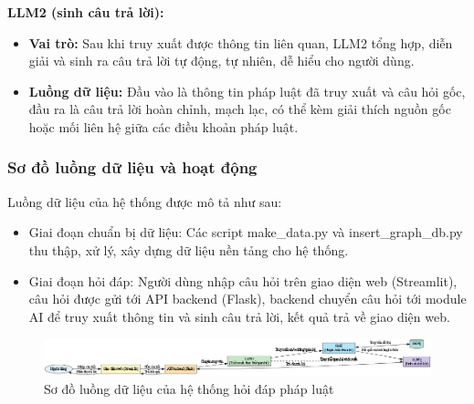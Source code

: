 \documentclass[a4paper]{article}
\begin{document}
\textbf{LLM2 (sinh câu trả lời):}
\begin{itemize}
    \item \textbf{Vai trò:} Sau khi truy xuất được thông tin liên quan, LLM2 tổng hợp, diễn giải và sinh ra câu trả lời tự động, tự nhiên, dễ hiểu cho người dùng.
    \item \textbf{Luồng dữ liệu:} Đầu vào là thông tin pháp luật đã truy xuất và câu hỏi gốc, đầu ra là câu trả lời hoàn chỉnh, mạch lạc, có thể kèm giải thích nguồn gốc hoặc mối liên hệ giữa các điều khoản pháp luật.
\end{itemize}

\subsubsection{Sơ đồ luồng dữ liệu và hoạt động}
Luồng dữ liệu của hệ thống được mô tả như sau:
\begin{itemize}
    \item Giai đoạn chuẩn bị dữ liệu: Các script make\_data.py và insert\_graph\_db.py thu thập, xử lý, xây dựng dữ liệu nền tảng cho hệ thống.
    \item Giai đoạn hỏi đáp: Người dùng nhập câu hỏi trên giao diện web (Streamlit), câu hỏi được gửi tới API backend (Flask), backend chuyển câu hỏi tới module AI để truy xuất thông tin và sinh câu trả lời, kết quả trả về giao diện web.
\end{itemize}
\begin{figure}[H]
    \centering
    \includegraphics[width=1.05\textwidth]{dataflow.png}
    \caption{Sơ đồ luồng dữ liệu của hệ thống hỏi đáp pháp luật}
\end{figure}
\end{document}
